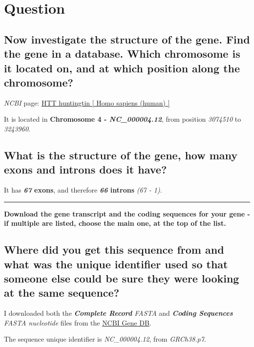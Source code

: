 \section{Question}

\subsection{Now investigate the structure of the gene. Find the gene in a database. Which chromosome is it located on, and at which position along the chromosome?}

\textit{NCBI} page: \href{https://www.ncbi.nlm.nih.gov/gene/3064}{HTT huntingtin [ Homo sapiens (human) ]}

It is located in \textbf{Chromosome 4 - \textit{NC\_000004.12}}, from position \textit{3074510} to \textit{3243960}.


\subsection{What is the structure of the gene, how many exons and introns does it have?}

It has \textbf{\textit{67} exons}, and therefore \textbf{\textit{66} introns} \textit{(67 - 1)}.


\begin{center}
    \textcolor[RGB]{180,180,180}{\rule{\textwidth}{0.4pt}}
\end{center}

\large{\textbf{Download the gene transcript and the coding sequences for your gene - if multiple are listed, choose the main one, at the top of the list.}}

\subsection{Where did you get this sequence from and what was the unique identifier used so that someone else could be sure they were looking at the same sequence?}

I downloaded both the \textit{\textbf{Complete Record} FASTA} and \textit{\textbf{Coding Sequences} FASTA nucleotide} files from the \href{https://www.ncbi.nlm.nih.gov/nuccore/NC_000004.12?report=fasta&from=3074510&to=3243960}{NCBI Gene DB}.

The sequence unique identifier is \textit{NC\_000004.12}, from	\textit{GRCh38.p7}.

